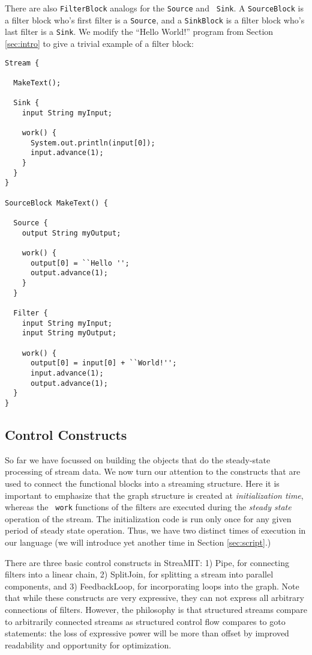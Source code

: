 \documentclass[draft]{article}
\begin{document}
There are also {\tt FilterBlock} analogs for the {\tt Source} and {\tt
Sink}.  A {\tt SourceBlock} is a filter block who's first filter is a
{\tt Source}, and a {\tt SinkBlock} is a filter block who's last
filter is a {\tt Sink}.  We modify the ``Hello World!''  program from
Section {\ref{sec:intro}} to give a trivial example of a filter block:

\begin{verbatim}
Stream {

  MakeText();

  Sink {
    input String myInput;
    
    work() {
      System.out.println(input[0]);
      input.advance(1);
    }
  }
}

SourceBlock MakeText() {

  Source {
    output String myOutput;

    work() {
      output[0] = ``Hello '';
      output.advance(1);
    }
  }

  Filter {
    input String myInput;
    input String myOutput;

    work() {
      output[0] = input[0] + ``World!'';
      input.advance(1);
      output.advance(1);
  }
}

\end{verbatim}

\subsection{Control Constructs}
\protect\label{sec:control}

So far we have focussed on building the objects that do the
steady-state processing of stream data.  We now turn our attention to
the constructs that are used to connect the functional blocks into a
streaming structure.  Here it is important to emphasize that the graph
structure is created at {\it initialization time}, whereas the {\tt
work} functions of the filters are executed during the {\it steady
state} operation of the stream.  The initialization code is run only
once for any given period of steady state operation.  Thus, we have
two distinct times of execution in our language (we will introduce yet
another time in Section {\ref{sec:script}}.)

There are three basic control constructs in StreaMIT: 1) Pipe, for
connecting filters into a linear chain, 2) SplitJoin, for splitting a
stream into parallel components, and 3) FeedbackLoop, for
incorporating loops into the graph.  Note that while these constructs
are very expressive, they can not express all arbitrary connections of
filters.  However, the philosophy is that structured streams compare
to arbitrarily connected streams as structured control flow compares
to goto statements: the loss of expressive power will be more than
offset by improved readability and opportunity for optimization.
\end{document}
